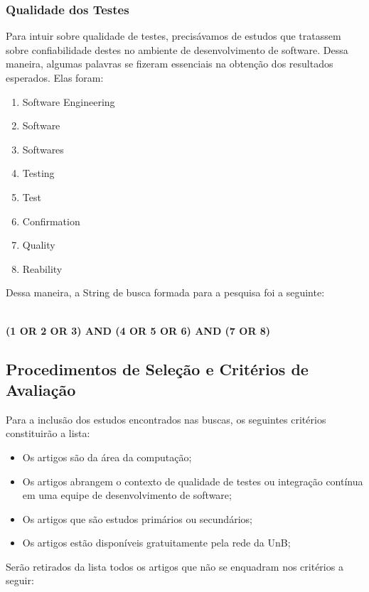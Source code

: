 \subsubsection{Qualidade dos Testes}
\label{sub:Qualidade dos Testes}
Para intuir sobre qualidade de testes, precisávamos de estudos que tratassem
sobre confiabilidade destes no ambiente de desenvolvimento de software. Dessa
maneira, algumas palavras se fizeram essenciais na obtenção dos resultados
esperados. Elas foram:

\begin{enumerate}
    \item Software Engineering
    \item Software
    \item Softwares
    \item Testing
    \item Test
    \item Confirmation
    \item Quality
    \item Reability
\end{enumerate}

Dessa maneira, a String de busca formada para a pesquisa foi a seguinte:
\\
\\
\centerline{\textbf{(1 OR 2 OR 3) AND (4 OR 5 OR 6) AND (7 OR 8)}}


\subsection{Procedimentos de Seleção e Critérios de Avaliação}
\label{sub:Procedimentos de Seleção e Critérios de Avaliação}

Para a inclusão dos estudos encontrados nas buscas, os seguintes
critérios constituirão a lista:

\begin{itemize}
    \item Os artigos são da área da computação;
    \item Os artigos abrangem o contexto de qualidade de testes ou integração
        contínua em uma equipe de desenvolvimento de software;
    \item Os artigos que são estudos primários ou secundários;
    \item Os artigos estão disponíveis gratuitamente pela rede da UnB;
\end{itemize}

Serão retirados da lista todos os artigos que não se enquadram nos
critérios a seguir:

